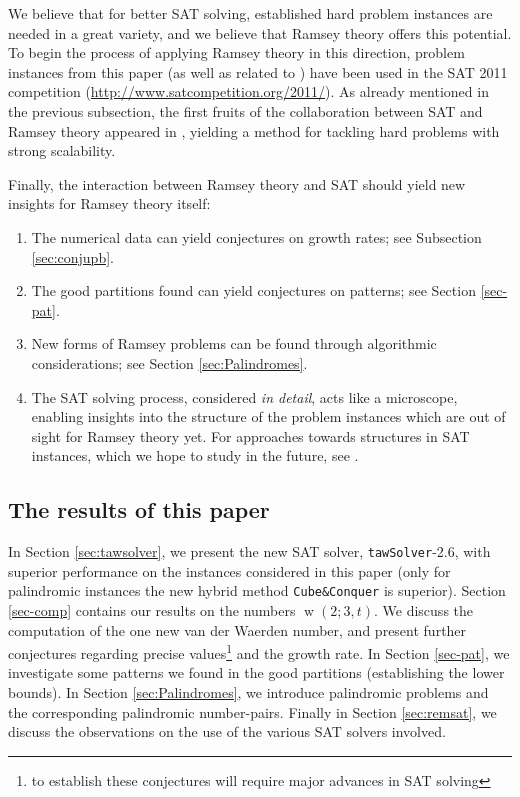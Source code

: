 \documentclass[final,3p,times]{elsarticle}
\theoremstyle{definition}
\newcommand{\OKlibrary}{\texttt{OKlibrary}}
\newcommand{\tawsolver}{\texttt{tawSolver}}
\newcommand{\ntawsolver}{\tawsolver-2.6}
\newcommand{\cubeconq}{\texttt{Cube\:\&\:Conquer}}
\DeclareMathOperator{\vdw}{w}
\begin{document}
We believe that for better SAT solving, established hard problem instances are needed in a great variety, and we
believe that Ramsey theory offers this potential. To begin the process of applying Ramsey theory in this direction,
problem instances from this paper (as well as related to \cite{kullmann}) have been used in the SAT 2011 competition
(\url{http://www.satcompetition.org/2011/}). As already mentioned in the previous subsection, the first fruits of the
collaboration between SAT and Ramsey theory appeared in \cite{HeuleKullmannWieringaBiere2011Cubism,TakHeuleBiere2012CC},
yielding a method for tackling hard problems with strong scalability.

Finally, the interaction between Ramsey theory and SAT should yield new insights for Ramsey theory itself:
\begin{enumerate}
\item The numerical data can yield conjectures on growth rates; see Subsection \ref{sec:conjupb}.
\item The good partitions found can yield conjectures on patterns; see Section \ref{sec-pat}.
\item New forms of Ramsey problems can be found through algorithmic considerations; see Section \ref{sec:Palindromes}.
\item The SAT solving process, considered \emph{in detail}, acts like a microscope, enabling insights into the structure of
the problem instances which are out of sight for Ramsey theory yet. For approaches towards structures in SAT instances,
which we hope to study in the future, see \cite{SS09HBSAT,Kullmann2007HandbuchMU}.
\end{enumerate}




\subsection{The results of this paper}
\label{sec:results}

In Section \ref{sec:tawsolver}, we present the new SAT solver, \ntawsolver, with superior performance on the instances considered in this paper (only for palindromic instances the new hybrid method \cubeconq{} is superior).
Section \ref{sec-comp} contains our results on the numbers $\vdw(2; 3, t)$. We discuss the computation of the one new van der Waerden number, and present further conjectures regarding precise values\footnote{to establish these conjectures will require major advances in SAT solving} and the growth rate. In Section \ref{sec-pat}, we investigate some patterns we found in the good partitions (establishing the lower bounds). In Section \ref{sec:Palindromes}, we introduce palindromic problems and the corresponding palindromic number-pairs. Finally in Section \ref{sec:remsat}, we discuss the observations on the use of the various SAT solvers involved.
\end{document}
